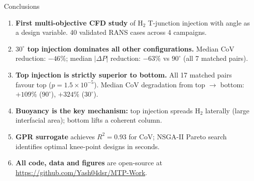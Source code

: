 \documentclass[10pt, aspectratio=169]{beamer}
\begin{document}
\begin{frame}{Conclusions}
    \begin{enumerate}
        \item \textbf{First multi-objective CFD study} of H$_2$ T-junction injection
              with angle as a design variable.
              40 validated RANS cases across 4 campaigns.

        \vspace{0.3em}
        \item \textbf{$30^\circ$ top injection dominates all other configurations.}
              Median CoV reduction: $-46\%$; median $|\Delta P|$ reduction: $-63\%$
              vs $90^\circ$ (all 7 matched pairs).

        \vspace{0.3em}
        \item \textbf{Top injection is strictly superior to bottom.}
              All 17 matched pairs favour top ($p = 1.5 \times 10^{-5}$).
              Median CoV degradation from top $\to$ bottom: $+109\%$ ($90^\circ$),
              $+324\%$ ($30^\circ$).

        \vspace{0.3em}
        \item \textbf{Buoyancy is the key mechanism:} top injection spreads H$_2$
              laterally (large interfacial area); bottom lifts a coherent column.

        \vspace{0.3em}
        \item \textbf{GPR surrogate} achieves $R^2 = 0.93$ for CoV;
              NSGA-II Pareto search identifies optimal knee-point designs
              in seconds.

        \vspace{0.3em}
        \item \textbf{All code, data and figures} are open-source at
              \url{https://github.com/Yash04dsr/MTP-Work}.
    \end{enumerate}
\end{frame}
\end{document}
